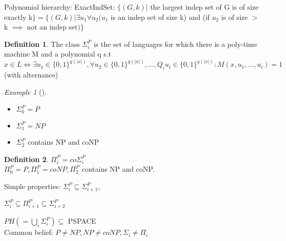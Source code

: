 \documentclass{article}
\theoremstyle{definition}
\newtheorem{definition}{Definition}
\theoremstyle{remark}
\newtheorem*{example}{Example}
\newcommand{\Ex}[3]{\begin{example}[#1]\label{#2}#3\end{example}}
\begin{document}
Polynomial hierarchy:
ExactIndSet: $\{(G,k)|$ the largest indep set of G is of size exactly k$\} = \{(G,k)|\exists u_1\forall u_2(u_1$ is an indep set of size k) and (if $u_2$ is of size $>$ k $\implies$ not an indep set$)\}$

\begin{definition}
	The class $\Sigma_{i}^{P}$ is the set of languages for which there is a poly-time machine M and a polynomial q s.t $x\in L \Leftrightarrow \exists u_1\in\{0,1\}^{q(|x|)},\forall u_2\in\{0,1\}^{q(|x|)},\dots,Q_i u_i\in\{0,1\}^{q(|x|)} : M(x,u_1,\dots,u_i) = 1$ (with alternance)
\end{definition}

\Ex{}{}{\begin{itemize}
		\item $\Sigma_{0}^{P} = P$
		\item $\Sigma_{1}^{P} = NP$
		\item $\Sigma_{2}^{P}$ contains NP and coNP
	\end{itemize}}
	
\begin{definition}
	$\Pi_{i}^{P} = co\Sigma_{i}^{P}$\\
	$\Pi_{0}^{P} = P,\Pi_{1}^{P} = coNP, \Pi_{2}^{P}$ contains NP and coNP.
\end{definition}

Simple properties: $\Sigma_{i}^{P} \subseteq \Sigma_{i+1}^{P}$,

 $\Sigma_{i}^{P} \subseteq \Pi_{i+1}^{P} \subseteq \Sigma_{i+2}^{P}$ 
 
 $PH (= \bigcup\limits_{i}\Sigma_{i}^{P}) \subseteq$ PSPACE\\
 
 Common belief: $P \neq NP, NP \neq coNP, \Sigma_{i} \neq \Pi_{i}$
 
\end{document}
